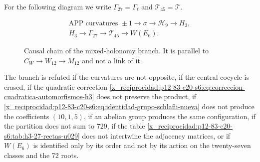 For the following diagram we write
\(\Gamma_{27}=\Gamma_\ell\) and \(\mathcal T_{45}=\mathcal T\).
\begin{figure}[htbp]
\centering
\[
 \begin{gathered}
 \text{APP curvatures }\pm1
 \longrightarrow\sigma
 \longrightarrow\mathcal H_9
 \longrightarrow H_3,\\[3pt]
 H_3
 \longrightarrow\Gamma_{27}
 \longrightarrow\mathcal T_{45}
 \longrightarrow W(E_6).
 \end{gathered}
\]
\caption{Causal chain of the mixed-holonomy branch. It is parallel to
\(C_W\to W_{12}\to M_{12}\) and not a link of it.}
\label{x_reciprocidad:p12-83-c20-s6:fig:cadena-holonomia-e6-u029}
\end{figure}

\begin{criterion}
\label{x_reciprocidad:p12-83-c20-s6:crit:refutacion-rama-e6-u029}
The branch is refuted if the curvatures are not opposite, if the central cocycle is erased, if the quadratic correction \eqref{x_reciprocidad:p12-83-c20-s6:eq:correccion-cuadratica-automorfismos-h3} does not preserve the product, if \eqref{x_reciprocidad:p12-83-c20-s6:eq:identidad-grupo-schlafli-nueva} does not produce the coefficients \((10,1,5)\), if an abelian group produces the same configuration, if the partition does not sum to 729, if the table \ref{x_reciprocidad:p12-83-c20-s6:tab:h3-27-rectas-u029} does not intertwine the adjacency matrices, or if \(W(E_6)\) is identified only by its order and not by its action on the twenty-seven classes and the 72 roots.
\end{criterion}
